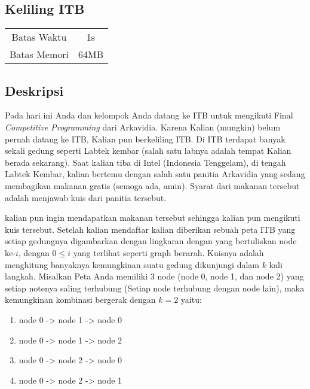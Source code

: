 \documentclass{article}
\begin{document}
\begin{center}
    \section*{Keliling ITB} %

    \begin{tabular}{ | c c | }
        \hline
        Batas Waktu  & 1s \\    %
        Batas Memori & 64MB \\  %
        \hline
    \end{tabular}
\end{center}

\subsection*{Deskripsi}
Pada hari ini Anda dan kelompok Anda datang ke ITB untuk mengikuti Final \textit{Competitive Programming} dari Arkavidia. Karena Kalian (mungkin) belum pernah
datang ke ITB, Kalian pun berkeliling ITB. Di ITB terdapat banyak sekali gedung seperti Labtek kembar (salah satu labnya adalah tempat Kalian berada sekarang).
Saat kalian tiba di Intel (Indonesia Tenggelam), di tengah Labtek Kembar, kalian bertemu dengan salah satu panitia Arkavidia yang sedang membagikan makanan gratis (semoga ada, amin).
Syarat dari makanan tersebut adalah menjawab kuis dari panitia tersebut.

kalian pun ingin mendapatkan makanan tersebut sehingga kalian pun mengikuti kuis tersebut. Setelah kalian mendaftar kalian diberikan sebuah peta ITB yang setiap gedungnya
digambarkan dengan lingkaran dengan yang bertuliskan node ke-$i$, dengan $0 \leq i$ yang terlihat seperti graph berarah. Kuisnya adalah menghitung banyaknya kemungkinan suatu gedung 
dikunjungi dalam $k$ kali langkah. Misalkan Peta Anda memiliki 3 node (node 0, node 1, dan node 2) yang setiap notenya saling terhubung (Setiap node terhubung dengan node lain), 
maka kemungkinan kombinasi bergerak dengan $k = 2 $ yaitu:

\begin{enumerate}
    \setlength\itemsep{0pt}
    \item node 0 -> node 1 -> node 0
    \item node 0 -> node 1 -> node 2
    \item node 0 -> node 2 -> node 0
    \item node 0 -> node 2 -> node 1
\end{enumerate}
\end{document}
